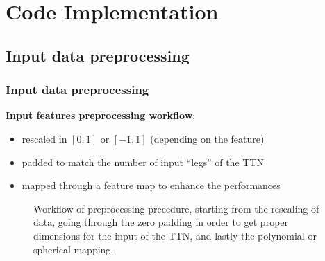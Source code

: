\documentclass[xcolor=table,8pt]{beamer}
\begin{document}
    
    







    \section{Code Implementation}

    \subsection{Input data preprocessing}
    \begin{frame}[t]
        \frametitle{Input data preprocessing}

        \textbf{Input features preprocessing workflow}:
        \begin{itemize}
            \item \alert{rescaled} in \( [0,1] \) or \( [-1,1] \) (depending on the feature)
            \item \alert{padded} to match the number of input ``legs'' of the TTN
            \item \alert{mapped} through a feature map to enhance the performances
        \end{itemize}

        \vspace{5pt}
        \begin{figure}[!h]
            \centering
            
            \caption{Workflow of preprocessing precedure, starting from the rescaling of data, going through the zero padding in order to get proper dimensions for the input of the TTN, and lastly the polynomial or spherical mapping.}
            \label{fig:code_preprocessing_workflow}
        \end{figure}
    \end{frame}
    
\end{document}
